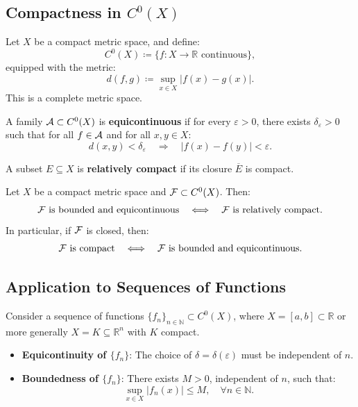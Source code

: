 \subsection{Compactness in \(C^0(X)\)}

Let \(X\) be a compact metric space, and define:
\[
C^0(X) \coloneqq \{ f : X \to \mathbb{R} \text{ continuous} \},
\]
equipped with the metric:
\[
d(f, g) \coloneqq \sup_{x \in X} |f(x) - g(x)|.
\]
This is a complete metric space.

\begin{definition}
A family \(\mathcal{A} \subset C^0(X)\) is \textbf{equicontinuous} if for every \(\varepsilon > 0\), there exists \(\delta_\varepsilon > 0\) such that for all \(f \in \mathcal{A}\) and for all \(x, y \in X\):
\[
d(x, y) < \delta_\varepsilon \quad \Rightarrow \quad |f(x) - f(y)| < \varepsilon.
\]
\end{definition}

\begin{definition}
A subset \(E \subseteq X\) is \textbf{relatively compact} if its closure \(\overline{E}\) is compact.
\end{definition}

\begin{theorem}
Let \(X\) be a compact metric space and \(\mathcal{F} \subset C^0(X)\). Then:
\[
\mathcal{F} \text{ is bounded and equicontinuous} \quad \Longleftrightarrow \quad \mathcal{F} \text{ is relatively compact}.
\]
In particular, if \(\mathcal{F}\) is closed, then:
\[
\mathcal{F} \text{ is compact} \quad \Longleftrightarrow \quad \mathcal{F} \text{ is bounded and equicontinuous}.
\]
\end{theorem}

\clearpage
\subsection{Application to Sequences of Functions}

Consider a sequence of functions \(\{f_n\}_{n \in \mathbb{N}} \subset C^0(X)\), where \(X = [a,b] \subset \mathbb{R}\) or more generally \(X = K \subseteq \mathbb{R}^n\) with \(K\) compact.

\begin{itemize}
    \item \textbf{Equicontinuity of \(\{f_n\}\)}: The choice of \(\delta = \delta(\varepsilon)\) must be independent of \(n\).
    \item \textbf{Boundedness of \(\{f_n\}\)}: There exists \(M > 0\), independent of \(n\), such that:
    \[
    \sup_{x \in X} |f_n(x)| \leq M, \quad \forall n \in \mathbb{N}.
    \]
\end{itemize}

